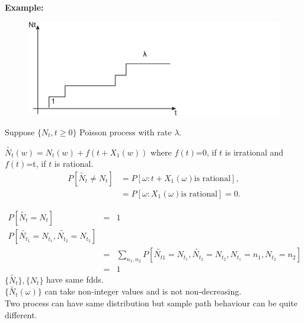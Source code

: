 \documentclass[a4paper,10pt]{article}
\theoremstyle{plain}
\theoremstyle{definition}
\begin{document}
   \textbf{Example:}\\
\begin{figure}[h!]
\center
  \includegraphics[width=4.5in]{Figures/rate.PNG}\\
\end{figure}
Suppose $\{N_{t}, t \geq 0\}$ Poisson process with rate $\lambda$. 

$\tilde{N_{t}}(w)= N_{t}(w)+f(t+X_{1}(w))$ where $f(t)$=0, if $t$ is irrational and $f(t)$=t, if $t$ is rational.\\
\begin{eqnarray*}
  P[\tilde{N_{t}}\neq N_{t}] &= P[\omega:t+X_{1}(\omega) \text{is rational}],\\
  &= P[\omega:X_1(\omega)  \text{is rational} ] =0.
\end{eqnarray*}
 
\begin{eqnarray*}
  P[\tilde{N_{t}}= N_{t}] &=& 1\\
  P[\tilde{N_{t_1}}= N_{t_1},\tilde{N_{t_2}}= N_{t_2} ] \\
  &=& \sum_{n_{1},n_{2}}P[\tilde{N_{t1}}= N_{t_1},\tilde{N_{t_2}}= N_{t_2}, N_{t_1}=n_1, N_{t_2}=n_2 ] \\
   &=& 1
\end{eqnarray*}
$\{\tilde{N_{t}}\}, \{N_{t}\}$ have same fdds.\\
$\{\tilde{N_{t}}(\omega)\}$ can take non-integer values and is not non-decreasing.\\
Two process can have same distribution but sample path behaviour can be quite different.\\
\end{document}
